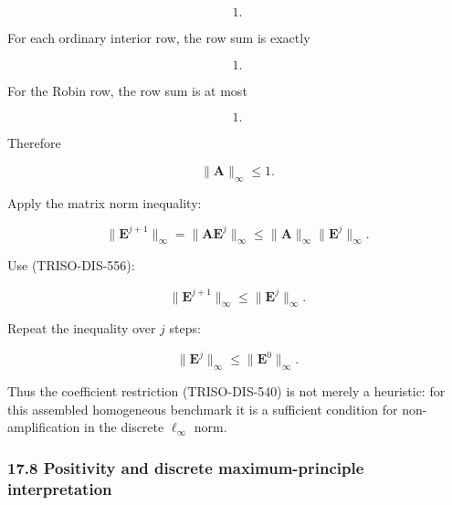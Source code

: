 \documentclass[11pt,a4paper]{article}
\begin{document}
\begin{equation}
1.
\tag{TRISO-DIS-553}
\label{eq:triso-dis-553}
\end{equation}

For each ordinary interior row, the row sum is exactly

\begin{equation}
1.
\tag{TRISO-DIS-554}
\label{eq:triso-dis-554}
\end{equation}

For the Robin row, the row sum is at most

\begin{equation}
1.
\tag{TRISO-DIS-555}
\label{eq:triso-dis-555}
\end{equation}

Therefore

\begin{equation}
\boxed{
\|\mathbf A\|_\infty\le1.
}
\tag{TRISO-DIS-556}
\label{eq:triso-dis-556}
\end{equation}

Apply the matrix norm inequality:

\begin{equation}
\|\mathbf E^{j+1}\|_\infty
=
\|\mathbf A\mathbf E^j\|_\infty
\le
\|\mathbf A\|_\infty
\|\mathbf E^j\|_\infty.
\tag{TRISO-DIS-557}
\label{eq:triso-dis-557}
\end{equation}

Use (TRISO-DIS-556):

\begin{equation}
\|\mathbf E^{j+1}\|_\infty
\le
\|\mathbf E^j\|_\infty.
\tag{TRISO-DIS-558}
\label{eq:triso-dis-558}
\end{equation}

Repeat the inequality over $j$ steps:

\begin{equation}
\boxed{
\|\mathbf E^j\|_\infty
\le
\|\mathbf E^0\|_\infty.
}
\tag{TRISO-DIS-559}
\label{eq:triso-dis-559}
\end{equation}

Thus the coefficient restriction (TRISO-DIS-540) is not merely a heuristic: for this assembled homogeneous benchmark it is a sufficient condition for non-amplification in the discrete $\ell_\infty$ norm.

\subsubsection*{17.8 Positivity and discrete maximum-principle interpretation}
\end{document}
